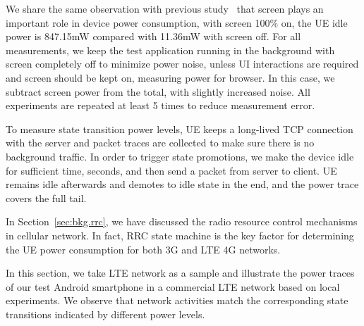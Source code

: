 We share the same observation with previous study~\cite{codes.powertutor} that screen plays an important role in device power consumption, \ie with screen 100\% on, the UE idle power is 847.15mW compared with 11.36mW with screen off. For all measurements, we keep the test application running in the background with screen completely off to minimize power noise, unless UI interactions are required and screen should be kept on, \ie measuring power for browser. In this case, we subtract screen power from the total, with slightly increased noise. All experiments are repeated at least 5 times to reduce measurement error.

To measure state transition power levels, UE keeps a long-lived TCP connection with the server and packet traces are collected to make sure there is no background traffic. In order to trigger state promotions, we make the device idle for sufficient time,  seconds, and then send a packet from server to client. UE remains idle afterwards and demotes to idle state in the end, and the power trace covers the full tail.


In Section~\ref{sec:bkg.rrc}, we have discussed the radio resource control mechanisms in cellular network. In fact, RRC state machine is the key factor for determining the UE power consumption for both 3G and LTE 4G networks.

In this section, we take LTE network as a sample and illustrate the power traces of our test Android smartphone in a commercial LTE network based on local experiments. We observe that network activities match the corresponding state transitions indicated by different power levels.

\begin{figure}[t]
\centering
{} \\
\label{fig:trace.all}
\end{figure}


